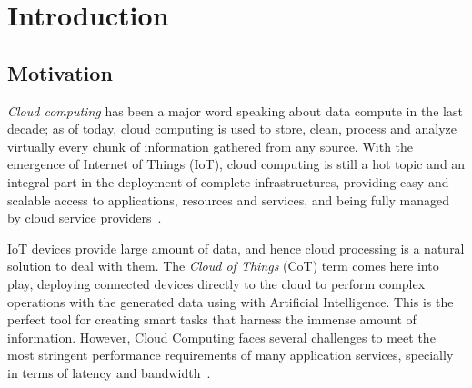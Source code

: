 
\cleardoublepage


\chapter{Introduction}
\label{makereference}



\section{Motivation}
\label{makereference1.1}

{\em Cloud computing} has been a major word speaking about data compute in the last decade; as of today, cloud computing is used to store, clean, process and analyze virtually every chunk of information gathered from any source.
%
With the emergence of Internet of Things (IoT), cloud computing is still a hot topic and an integral part in the deployment of complete infrastructures, providing easy and scalable access to applications, resources and services, and being fully managed by  cloud service providers~\cite{cloud_def}.

IoT devices provide large amount of data, and hence cloud processing is a natural solution to deal with them. 
%
The {\em Cloud of Things} (CoT) term comes here into play,  deploying connected devices directly to the cloud to perform complex operations with the generated data using with Artificial Intelligence. This is the perfect tool for creating smart tasks that harness the immense amount of information.
%
However, Cloud Computing faces several challenges to meet the most stringent performance requirements of many application services, specially in terms of latency and bandwidth~\cite{IEE:Morabito:2017}.


